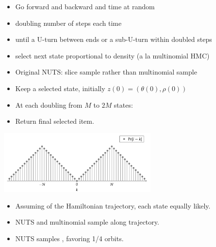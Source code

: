 \documentclass[10pt]{report}
\begin{document}
\begin{itemize}
\item Go forward and backward and time at random
\item doubling number of steps each time
\item until a U-turn between ends or a sub-U-turn within doubled steps
\item select next state proportional to density (a la multinomial HMC)
  \vfill
\item Original NUTS: slice sample rather than multinomial sample
\end{itemize}

\begin{itemize}
\item Keep a selected state, initially $z(0) = (\theta(0), \rho(0))$
\item At each doubling from $M$ to $2M$ states:
\item Return final selected item.
\end{itemize}

\begin{center}
\includegraphics[width=0.6\textwidth]{img/multinomial-hmc-L.png}
\end{center}
\begin{itemize}
\item Assuming  of the Hamiltonian trajectory, each state equally likely.
\item {} NUTS and multinomial sample  along trajectory.
\item {} NUTS samples , favoring 1/4 orbits.
\end{itemize}
\end{document}
